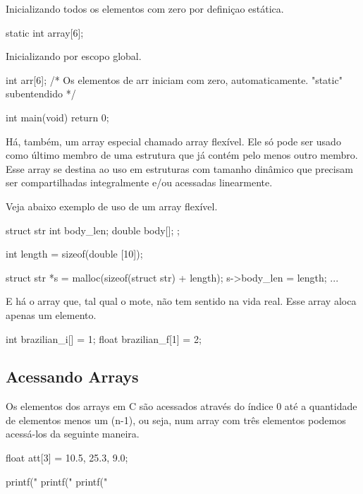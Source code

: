 Inicializando todos os elementos com zero por definiçao estática.

\begin{ccode}
  static int array[6];
\end{ccode}

Inicializando por escopo global.

\begin{ccode}
  int arr[6];  /* Os elementos de arr iniciam
                  com zero, automaticamente.
                  "static" subentendido */

  int main(void)
  {
    return 0;
  }
\end{ccode}

Há, também, um array especial chamado array flexível. Ele só pode ser usado
como último membro de uma estrutura que já contém pelo menos outro membro. Esse
array se destina ao uso em estruturas com tamanho dinâmico que precisam ser
compartilhadas integralmente e/ou acessadas linearmente.

Veja abaixo exemplo de uso de um array flexível.

\begin{ccode}
  struct str {
    int body_len;
    double body[];
  };

  int length = sizeof(double [10]);

  struct str *s = malloc(sizeof(struct str) + length);
  s->body_len = length;
  ...
\end{ccode}

E há o array  que, tal qual o mote, não
tem sentido na vida real. Esse array aloca apenas um elemento.

\begin{ccode}
  int brazilian_i[] = {1};
  float brazilian_f[1] = {2};
\end{ccode}

\subsection{Acessando Arrays}
Os elementos dos arrays em C são acessados através do índice 0 até a quantidade
de elementos menos um (n-1), ou seja, num array com três elementos podemos
acessá-los da seguinte maneira.

\begin{ccode}
  float att[3] = {10.5, 25.3, 9.0};

  printf("%
  printf("%
  printf("%
\end{ccode}

